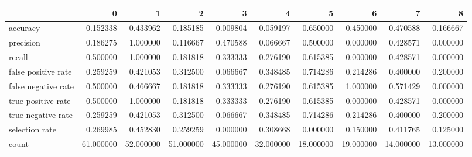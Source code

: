\begin{tabular}{lrrrrrrrrr}
\toprule
{} &          0 &          1 &          2 &          3 &          4 &          5 &          6 &          7 &          8 \\
\midrule
accuracy            &   0.152338 &   0.433962 &   0.185185 &   0.009804 &   0.059197 &   0.650000 &   0.450000 &   0.470588 &   0.166667 \\
precision           &   0.186275 &   1.000000 &   0.116667 &   0.470588 &   0.066667 &   0.500000 &   0.000000 &   0.428571 &   0.000000 \\
recall              &   0.500000 &   1.000000 &   0.181818 &   0.333333 &   0.276190 &   0.615385 &   0.000000 &   0.428571 &   0.000000 \\
false positive rate &   0.259259 &   0.421053 &   0.312500 &   0.066667 &   0.348485 &   0.714286 &   0.214286 &   0.400000 &   0.200000 \\
false negative rate &   0.500000 &   0.466667 &   0.181818 &   0.333333 &   0.276190 &   0.615385 &   1.000000 &   0.571429 &   0.000000 \\
true positive rate  &   0.500000 &   1.000000 &   0.181818 &   0.333333 &   0.276190 &   0.615385 &   0.000000 &   0.428571 &   0.000000 \\
true negative rate  &   0.259259 &   0.421053 &   0.312500 &   0.066667 &   0.348485 &   0.714286 &   0.214286 &   0.400000 &   0.200000 \\
selection rate      &   0.269985 &   0.452830 &   0.259259 &   0.000000 &   0.308668 &   0.000000 &   0.150000 &   0.411765 &   0.125000 \\
count               &  61.000000 &  52.000000 &  51.000000 &  45.000000 &  32.000000 &  18.000000 &  19.000000 &  14.000000 &  13.000000 \\
\bottomrule
\end{tabular}
